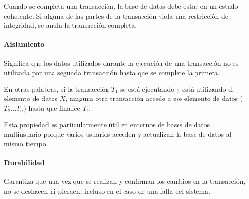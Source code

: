 Cuando se completa una transacción, la base de datos debe estar en un estado coherente. Si alguna de las partes de la transacción viola una restricción de integridad, se anula la transacción completa.
\paragraph*{Aislamiento}
Significa que los datos utilizados durante la ejecución de una transacción no es utilizada por una segunda transacción hasta que se complete la primera. 


En otras palabras, si la transacción $T_{1}$ se está ejecutando y está utilizando el elemento de datos $X$, ninguna otra transacción accede a ese elemento de datos ($T_{2}...T_{n}$) hasta que finalice $T_{1}$.


Esta propiedad es particularmente útil en entornos de bases de datos multiusuario porque varios usuarios acceden y actualizan la base de datos al mismo tiempo.
\paragraph*{Durabilidad}

Garantiza que una vez que se realizan y confirman los cambios en la transacción, no se deshacen ni pierden, incluso en el caso de una falla del sistema.